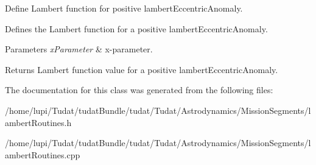 Define Lambert function for positive lambert\+Eccentric\+Anomaly. 

Defines the Lambert function for a positive lambert\+Eccentric\+Anomaly. 
\begin{DoxyParams}{Parameters}
{\em x\+Parameter} & x-\/parameter. \\
\hline
\end{DoxyParams}
\begin{DoxyReturn}{Returns}
Lambert function value for a positive lambert\+Eccentric\+Anomaly. 
\end{DoxyReturn}


The documentation for this class was generated from the following files\+:\begin{DoxyCompactItemize}
\item 
/home/lupi/\+Tudat/tudat\+Bundle/tudat/\+Tudat/\+Astrodynamics/\+Mission\+Segments/lambert\+Routines.\+h\item 
/home/lupi/\+Tudat/tudat\+Bundle/tudat/\+Tudat/\+Astrodynamics/\+Mission\+Segments/lambert\+Routines.\+cpp\end{DoxyCompactItemize}
